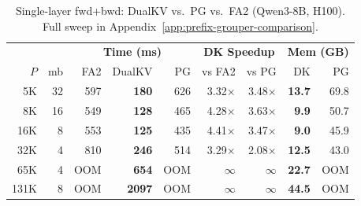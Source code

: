\documentclass{article}
\begin{document}
\begin{table}
\vspace{-1em}
\centering
\scriptsize
\setlength{\tabcolsep}{3pt}
\caption{Single-layer fwd+bwd: DualKV vs.\ PG vs.\ FA2 (Qwen3-8B, H100). Full sweep in Appendix~\ref{app:prefix-grouper-comparison}.}
\label{tab:prefix-grouper-main}
\begin{tabular}{@{}rr|rrr|rr|rr@{}}
\toprule
& & \multicolumn{3}{c|}{\textbf{Time (ms)}} & \multicolumn{2}{c|}{\textbf{DK Speedup}} & \multicolumn{2}{c}{\textbf{Mem (GB)}} \\
$P$ & mb & FA2 & DualKV & PG & vs FA2 & vs PG & DK & PG \\
\midrule
5K  & 32 & 597  & \textbf{180} & 626  & 3.32$\times$ & 3.48$\times$ & \textbf{13.7} & 69.8 \\
8K  & 16 & 549  & \textbf{128} & 465  & 4.28$\times$ & 3.63$\times$ & \textbf{9.9}  & 50.7 \\
16K & 8  & 553  & \textbf{125} & 435  & 4.41$\times$ & 3.47$\times$ & \textbf{9.0}  & 45.9 \\
32K & 4  & 810  & \textbf{246} & 514  & 3.29$\times$ & 2.08$\times$ & \textbf{12.5} & 43.0 \\
65K & 4  & OOM  & \textbf{654} & OOM  & $\infty$     & $\infty$     & \textbf{22.7} & OOM \\
131K& 8  & OOM  & \textbf{2097}& OOM  & $\infty$     & $\infty$     & \textbf{44.5} & OOM \\
\bottomrule
\end{tabular}
\end{table}
\end{document}
